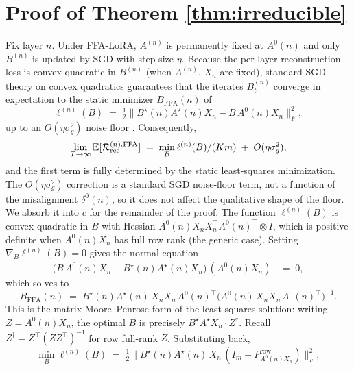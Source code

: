 \section{Proof of Theorem \ref{thm:irreducible}}
\label{app:proof_of_irreducible}
Fix layer $n$. Under FFA-LoRA, $A^{(n)}$ is permanently fixed at $A^0(n)$ and only $B^{(n)}$ is updated by SGD with step size $\eta$. Because the per-layer reconstruction loss is convex quadratic in $B^{(n)}$ (when $A^{(n)}$, $X_n$ are fixed), standard SGD theory on convex quadratics guarantees that the iterates $B^{(n)}_t$ converge in expectation to the static minimizer $B_\text{FFA}(n)$ of
\begin{equation}
\ell^{(n)}(B) \;=\; \tfrac12\bigl\|B^\star(n)A^\star(n) X_n - B\,A^0(n) X_n\bigr\|_F^2,
\end{equation}
up to an $O(\eta\sigma_g^2)$ noise floor \cite{bottou2018sgd}. Consequently,
\begin{equation}
\lim_{T\to\infty}\mathbb{E}[\mathcal R_\text{rec}^{(n),\text{FFA}}] \;=\; \min_B\ell^{(n)}(B)/(Km) \;+\; O(\eta\sigma_g^2),
\end{equation}
and the first term is fully determined by the static least-squares minimization. The $O(\eta\sigma_g^2)$ correction is a standard SGD noise-floor term, not a function of the misalignment $\delta^0(n)$, so it does not affect the qualitative shape of the floor. We absorb it into $\tilde c$ for the remainder of the proof. The function $\ell^{(n)}(B)$ is convex quadratic in $B$ with Hessian $A^0(n)X_n X_n^\top A^0(n)^\top\otimes I$, which is positive definite when $A^0(n)X_n$ has full row rank (the generic case). Setting $\nabla_B\ell^{(n)}(B)=0$ gives the normal equation
\begin{equation}
\bigl(B\,A^0(n) X_n - B^\star(n) A^\star(n) X_n\bigr)\,(A^0(n) X_n)^\top \;=\; 0,
\end{equation}
which solves to
\begin{equation}
B_\text{FFA}(n) \;=\; B^\star(n)A^\star(n)\,X_n X_n^\top A^0(n)^\top \bigl(A^0(n)\,X_n X_n^\top A^0(n)^\top\bigr)^{-1}.
\end{equation}
This is the matrix Moore--Penrose form of the least-squares solution: writing $Z=A^0(n)X_n$, the optimal $B$ is precisely $B^\star A^\star X_n\cdot Z^\dagger$. Recall $Z^\dagger=Z^\top(ZZ^\top)^{-1}$ for row full-rank $Z$. Substituting back,
\begin{equation}
\min_B \ell^{(n)}(B) \;=\; \tfrac12\bigl\|B^\star(n)A^\star(n)\,X_n\,(I_m-P^\text{row}_{A^0(n) X_n})\bigr\|_F^2,
\end{equation}

